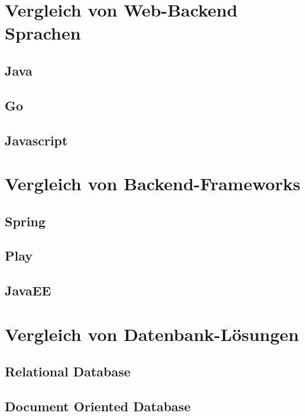 \section{Vergleich von Web-Backend Sprachen}
\subsection{Java}
\subsection{Go}
\subsection{Javascript}
\section{Vergleich von Backend-Frameworks}
\subsection{Spring}
\subsection{Play}
\subsection{JavaEE}
\section{Vergleich von Datenbank-Lösungen}
\subsection{Relational Database}
\subsection{Document Oriented Database}